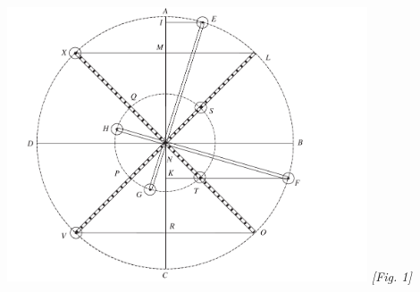  \vspace{2em}\begin{center}
 \includegraphics[width=0.8\textwidth]{images/25rx1a.pdf}
 \vspace{1cm}
\hspace{5cm}
 \textit{[Fig. 1]}\\
 \end{center}
 \vspace{1em}
\begin{center}  \end{center} \pend \pstart 
